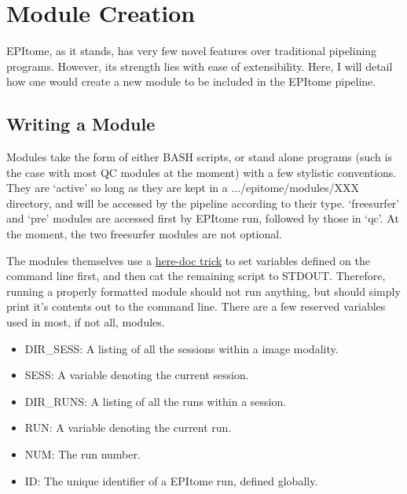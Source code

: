 \documentclass[final,titlepage,letterpaper,oneside,12pt]{article}
\renewcommand{\texttt}[2][BrickRed]{\textcolor{#1}{\ttfamily #2}}%
\begin{document}
\section{Module Creation}

EPItome, as it stands, has very few novel features over traditional pipelining programs. However, its strength lies with ease of extensibility. Here, I will detail how one would create a new module to be included in the EPItome pipeline.

\subsection{Writing a Module}

Modules take the form of either BASH scripts, or stand alone programs (such is the case with most QC modules at the moment) with a few stylistic conventions. They are `active' so long as they are kept in a \texttt{.../epitome/modules/XXX} directory, and will be accessed by the pipeline according to their type. `freesurfer' and `pre' modules are accessed first by \texttt{EPItome run}, followed by those in `qc'. At the moment, the two freesurfer modules are not optional.

The modules themselves use a \href{http://tldp.org/LDP/abs/html/here-docs.html}{here-doc trick} to set variables defined on the command line first, and then \texttt{cat} the remaining script to \texttt{STDOUT}. Therefore, running a properly formatted module should not run anything, but should simply print it's contents out to the command line. There are a few reserved variables used in most, if not all, modules. 

\begin{itemize}
    \item{DIR\_SESS: A listing of all the sessions within a image modality.}
    \item{SESS: A variable denoting the current session.}
    \item{DIR\_RUNS: A listing of all the runs within a session.}
    \item{RUN: A variable denoting the current run.}
    \item{NUM: The run number.}
    \item{ID: The unique identifier of a EPItome run, defined globally.}
\end{itemize}
\end{document}
